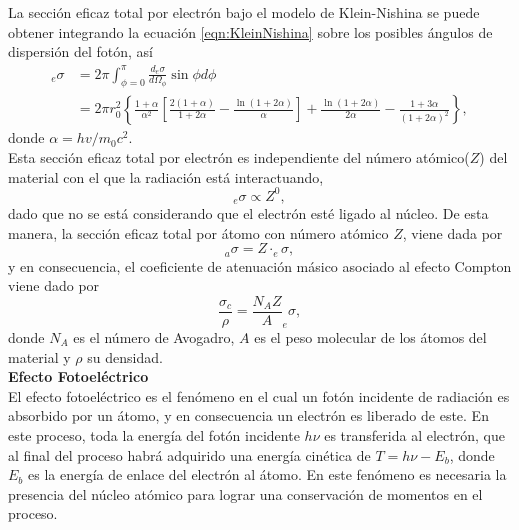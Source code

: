 La sección eficaz total por electrón bajo el modelo de Klein-Nishina se puede obtener integrando la ecuación \eqref{eqn:KleinNishina} sobre los posibles ángulos de dispersión del fotón, así
\begin{equation}
\begin{split}
_{e}\sigma&=2 \pi \int_{\phi=0}^{\pi} \frac{d_{e} \sigma}{d \Omega_{\phi}} \sin \phi d \phi\\
&=2 \pi r_{0}^{2}\left\{\frac{1+\alpha}{\alpha^{2}}\left[\frac{2(1+\alpha)}{1+2 \alpha}-\frac{\ln (1+2 \alpha)}{\alpha}\right]+\frac{\ln (1+2 \alpha)}{2 \alpha}-\frac{1+3 \alpha}{(1+2 \alpha)^{2}}\right\},
\end{split}
\end{equation}
donde $\alpha=hv/m_0c^2$.\\

Esta sección eficaz total por electrón es independiente del número atómico($Z$) del material con el que la radiación está interactuando,
\begin{equation}
	_{e}\sigma\propto Z^0,
\end{equation}
dado que no se está considerando que el electrón esté ligado al núcleo. De esta manera, la sección eficaz total por átomo con número atómico $Z$, viene dada por 
\begin{equation}
	_{a}\sigma=Z\cdot _{e}\sigma,
\end{equation}
y en consecuencia, el coeficiente de atenuación másico asociado al efecto Compton viene dado por 
\begin{equation}
	\frac{\sigma_c}{\rho}=\frac{N_{A}Z}{A}  _{e}\sigma,
\end{equation} 
donde $N_A$ es el número de Avogadro, $A$ es el peso molecular de los átomos del material y $\rho$ su densidad.\\

\textbf{Efecto Fotoeléctrico}\\

El efecto fotoeléctrico es el fenómeno en el cual un fotón incidente de radiación es absorbido por un átomo, y en consecuencia un electrón es liberado de este. En este proceso, toda la energía del fotón incidente $h\nu$ es transferida al electrón, que al final del proceso habrá adquirido una energía cinética de $T=h\nu-E_b$, donde $E_b$ es la energía de enlace del electrón al átomo. En este fenómeno es necesaria la presencia del núcleo atómico para lograr una conservación de momentos en el proceso. \\

